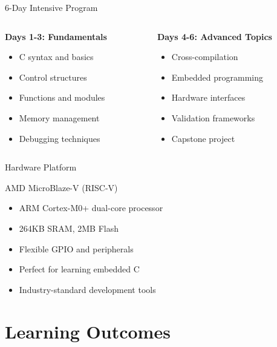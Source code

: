 \documentclass[aspectratio=169]{beamer}
\begin{document}
\begin{frame}{6-Day Intensive Program}
  \begin{columns}
    \begin{column}{0.5\textwidth}
      \textbf{Days 1-3: Fundamentals}
      \begin{itemize}
        \item C syntax and basics
        \item Control structures
        \item Functions and modules
        \item Memory management
        \item Debugging techniques
      \end{itemize}
    \end{column}
    \begin{column}{0.5\textwidth}
      \textbf{Days 4-6: Advanced Topics}
      \begin{itemize}
        \item Cross-compilation
        \item Embedded programming
        \item Hardware interfaces
        \item Validation frameworks
        \item Capstone project
      \end{itemize}
    \end{column}
  \end{columns}
\end{frame}

\begin{frame}{Hardware Platform}
  \begin{exampleblock}{AMD MicroBlaze-V (RISC-V)}
    \begin{itemize}
      \item ARM Cortex-M0+ dual-core processor
      \item 264KB SRAM, 2MB Flash
      \item Flexible GPIO and peripherals
      \item Perfect for learning embedded C
      \item Industry-standard development tools
    \end{itemize}
  \end{exampleblock}
\end{frame}

\section{Learning Outcomes}
\end{document}
